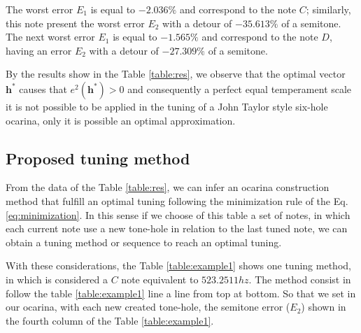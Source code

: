 \documentclass[11pt,twocolumn]{article}
\begin{document}
The worst error $E_1$ is equal to $-2.036\%$ and correspond to the note $C$; 
similarly, this note present the worst error $E_2$ with a detour of $-35.613\%$ of a semitone. 
The next worst error $E_1$ is equal to $-1.565\%$ and correspond to the note $D$,
having an error $E_2$ with a detour of $-27.309\%$ of a semitone.

By the results show in the Table \ref{table:res}, we observe that 
the optimal vector $\mathbf{h^*}$ causes that $e^2(\mathbf{h^*})> 0$
and consequently a perfect equal temperament scale 
it is not possible to be applied in the tuning of a John Taylor style six-hole ocarina,
only it is possible an optimal approximation. 

\subsection{Proposed tuning method}
From the data of the Table \ref{table:res}, 
we can infer an ocarina construction method that fulfill 
an optimal tuning following the minimization rule of the Eq. \ref{eq:minimization}.
In this sense if we choose of this table a set of notes, 
in which each current note use a new tone-hole in relation to the last tuned note, 
we can obtain a tuning method or sequence to reach an optimal tuning.

With these considerations, the Table \ref{table:example1} shows one tuning method, 
in which is considered a $C$ note equivalent to $523.2511 hz$.
The method consist in follow the table \ref{table:example1} line a line from top at bottom. 
So that we set in our ocarina, with each new created tone-hole, 
the semitone error ($E_2$) shown in the fourth column of the Table \ref{table:example1}.
\end{document}
